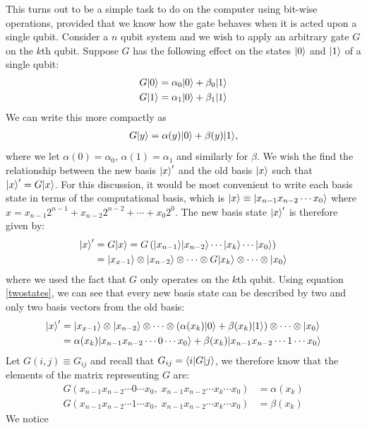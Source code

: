 \documentclass[bibliography=totocnumbered]{article}
\theoremstyle{NoticeStyle}
\begin{document}
This turns out to be a simple task to do on the computer using bit-wise operations, provided that we know how the gate behaves when it is acted upon a single qubit. Consider a $n$ qubit system and we wish to apply an arbitrary gate $G$ on the $k$th qubit. Suppose $G$ has the following effect on the states ${\left\vert{0}\right\rangle}$ and ${\left\vert{1}\right\rangle}$ of a single qubit:
\begin{align}
	G{\left\vert{0}\right\rangle} &= \alpha_0 {\left\vert{0}\right\rangle} + \beta_0 {\left\vert{1}\right\rangle}\\
	G{\left\vert{1}\right\rangle} &= \alpha_1 {\left\vert{0}\right\rangle} + \beta_1 {\left\vert{1}\right\rangle}
\end{align} 
We can write this more compactly as
\begin{align}
 G{\left\vert{y}\right\rangle} = \alpha(y){\left\vert{0}\right\rangle} + \beta(y){\left\vert{1}\right\rangle}, \label{twostates}
\end{align}
 where we let $\alpha(0) = \alpha_0$, $\alpha(1) = \alpha_1$ and similarly for $\beta$.
We wish the find the relationship between the new basis ${\left\vert{x}\right\rangle}'$ and the old basis ${\left\vert{x}\right\rangle}$ such that ${\left\vert{x}\right\rangle}' = G{\left\vert{x}\right\rangle}$. For this discussion, it would be most convenient to write each basis state in terms of the computational basis, which is ${\left\vert{x}\right\rangle} \equiv {\left\vert{x_{n-1}x_{n-2}\dotsm x_0}\right\rangle}$ where $x = x_{n-1}2^{n-1} + x_{n-2}2^{n-2} + \dotsb + x_0 2^0$. The new basis state ${\left\vert{x}\right\rangle}'$ is therefore given by:
\begin{align}
	{\left\vert{x}\right\rangle}' &= G{\left\vert{x}\right\rangle} = G\left({\left\vert{x_{n-1}}\right\rangle} {\left\vert{x_{n-2}}\right\rangle} \dotsm {\left\vert{x_k}\right\rangle} \dotsm {\left\vert{x_0}\right\rangle}\right)\\
	&= {\left\vert{x_{x-1}}\right\rangle} \otimes {\left\vert{x_{n-2}}\right\rangle} \otimes \dotsm \otimes G{\left\vert{x_k}\right\rangle} \otimes \dotsm \otimes {\left\vert{x_0}\right\rangle}
\end{align}
where we used the fact that $G$ only operates on the $k$th qubit. Using equation \ref{twostates}, we can see that every new basis state can be described by two and only two basis vectors from the old basis:
\begin{align}
	{\left\vert{x}\right\rangle}' &= {\left\vert{x_{x-1}}\right\rangle} \otimes {\left\vert{x_{n-2}}\right\rangle} \otimes \dotsm \otimes \left(\alpha(x_k){\left\vert{0}\right\rangle} + \beta(x_k){\left\vert{1}\right\rangle} \right)  \otimes \dotsm \otimes {\left\vert{x_0}\right\rangle}\\
	&= \alpha(x_k){\left\vert{x_{n-1}x_{n-2}\dotsm 0 \dotsm x_0}\right\rangle} + \beta(x_k){\left\vert{x_{n-1}x_{n-2}\dotsm 1 \dotsm x_0}\right\rangle}
\end{align}
Let $G(i,j) \equiv G_{ij}$ and recall that $G_{ij} = {\left\langle{i}\right\vert} G {\left\vert{j}\right\rangle}$, we therefore know that the elements of the matrix representing $G$ are:
\begin{align}
	G(x_{n-1}x_{n-2}\dotsm0\dotsm x_0,\;x_{n-1}x_{n-2}\dotsm x_k\dotsm x_0) &= \alpha(x_k)\\
	G(x_{n-1}x_{n-2}\dotsm1\dotsm x_0,\;x_{n-1}x_{n-2}\dotsm x_k\dotsm x_0) &= \beta(x_k)
\end{align}
We notice
\end{document}
